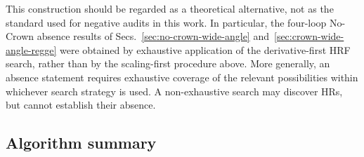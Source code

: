 \documentclass[a4paper,11pt]{article}
\begin{document}
This construction should be regarded as a theoretical alternative, not as
the standard used for negative audits in this work.  In particular, the
four-loop No-Crown absence results of
Secs.~\ref{sec:no-crown-wide-angle} and~\ref{sec:crown-wide-angle-regge}
were obtained by exhaustive application of the derivative-first HRF search,
rather than by the scaling-first procedure above.  More generally, an
absence statement requires exhaustive coverage of the relevant possibilities
within whichever search strategy is used.  A non-exhaustive search may
discover HRs, but cannot establish their absence.

\subsection{Algorithm summary}
\label{sec:workflow}
\end{document}
